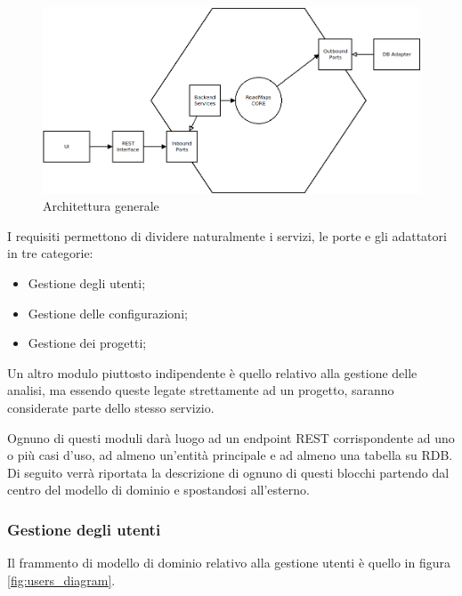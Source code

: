 \begin{figure}[h]
	\centering
	\includegraphics[width=\textwidth]{img/architecture00}
	\caption{Architettura generale}
	\label{fig:architecture00}
\end{figure}

I requisiti permettono di dividere naturalmente i servizi, le porte e gli adattatori in tre categorie:
\begin{itemize}
	\item Gestione degli utenti;
	\item Gestione delle configurazioni;
	\item Gestione dei progetti;
\end{itemize}

Un altro modulo piuttosto indipendente è quello relativo alla gestione delle analisi, ma essendo queste legate strettamente ad un progetto, saranno considerate parte dello stesso servizio.

Ognuno di questi moduli darà luogo ad un endpoint REST corrispondente ad uno o più casi d'uso, ad almeno un'entità principale e ad almeno una tabella su RDB.
Di seguito verrà riportata la descrizione di ognuno di questi blocchi partendo dal centro del modello di dominio e spostandosi all'esterno.

\subsubsection{Gestione degli utenti}
Il frammento di modello di dominio relativo alla gestione utenti è quello in figura \ref{fig:users_diagram}.

